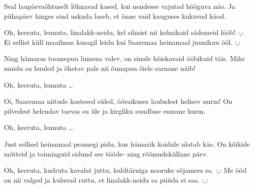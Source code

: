Seal laup\"aeva\~ohtuselt l\~ohnavad kased,
kui nendesse vajutad h\~o\~oguva n\"ao.
Ja p\"uhap\"aev hinges sind uskuda laseb,
et \~onne vaid kauguses kukuvad k\"aod.

Oh, keeruta, lennuta, linalakk-neidu,
kel silmist nii kelmikaid s\"ademeid l\"o\"ob!
:,: Ei sellist k\"ull maailmas kusagil leidu
kui Saaremaa heinamaal juunikuu \"o\"ol. :,:

Ning h\"amaras toomepuu lumena valev,
on sinule h\~oiskavaid \"o\"obikuid t\"ais.
Miks muidu su huuled ja \~ohetav pale
nii \~ounapuu \~oiele sarnane n\"aib!

Oh, keeruta, lennuta \ldots

Oi, Saaremaa niitude kastesed s\"uled,
\"o\"ovaikuses lauludest helisev nurm!
On pilvedest helendav taevas su \"ule
ja kirgliku suudluse esmane hurm.

Oh, keeruta, lennuta \ldots

Just sellisel heinamaal peamegi pidu,
kus h\"amarik koidule ulatab k\"ae.
On k\~oikide m\~otteid ja toiminguid sidund
see t\"o\"ode- ning r\~o\~omudek\"ullane p\"aev.

Oh, keeruta, kudruta kavalat juttu,
kuldt\"arniga nooruke s\~ojamees sa.
:,: Me \"o\"od on nii valged ja kuluvad ruttu,
et linalakk-neidu sa p\"u\"uda ei saa. :,:
